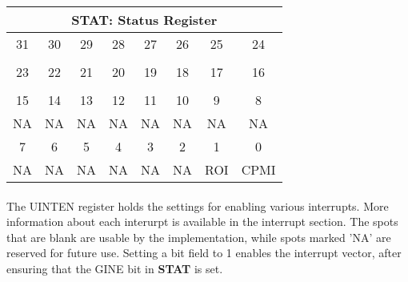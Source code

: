 \documentclass[letterpaper, 11pt]{article}
\begin{document}
\begin{center}
	\begin{tabular}{|c|c|c|c|c|c|c|c|}
			\multicolumn{8}{c}{\textbf{STAT}: Status Register}  \\ \hline

		 	31 	& 30  	&  29   &	28	&	27	&	26 	&   25 		&	24 		\\ 
			\hspace{5pt} 	& \hspace{5pt} 	& \hspace{5pt} 	& \hspace{5pt} 	& \hspace{5pt}	& \hspace{5pt} 	& \hspace{5pt}	& \hspace{5pt}    \\ \hline
		 	23 	& 22  	&  21  	&	20	&	19	&	18 	&   17 		&	16 		\\ 
			\hspace{5pt} 	& \hspace{5pt} 	& \hspace{5pt} 	& \hspace{5pt} 	& \hspace{5pt}	& \hspace{5pt} 	& \hspace{5pt}	& \hspace{5pt}    \\ \hline
		 	15 	& 14  	&  13   &	12	&	11	&	10 	&	9 		&	8 		\\ 
			NA 	& NA 	& NA 	& NA 	& NA 	& NA 	& NA 		& NA    \\ \hline
		 	7 	& 6  	&  5   	&	4	&	3	&	2  	&	1 		&	0 		\\ 
			NA 	& NA 	& NA 	& NA 	& NA 	& NA   	& ROI  		& CPMI    \\ \hline
		
	\end{tabular}
\end{center}

\paragraph{} The UINTEN register holds the settings for enabling various interrupts. More information about each interurpt
is available in the interrupt section. The spots that are blank are usable by the implementation, while spots marked 'NA'
are reserved for future use. Setting a bit field to 1 enables the interrupt vector, after ensuring that the GINE bit in \textbf{STAT} is set.
\end{document}
